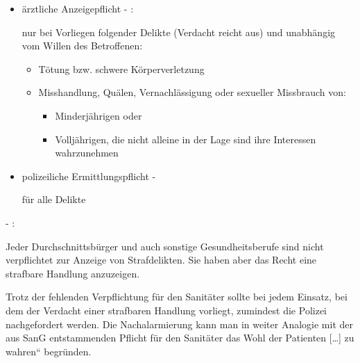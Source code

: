 \begin{itemize}
    \item {\mdseries
    ärztliche Anzeigepflicht - :}
    
    {\mdseries
    nur bei Vorliegen folgender Delikte (Verdacht reicht aus) und
    unabhängig vom Willen des Betroffenen:}
    
    \begin{itemize}
        \item {\mdseries
        T\"otung bzw. schwere K\"orperverletzung}
        
        \item {\mdseries
        Misshandlung, Quälen, Vernachlässigung oder sexueller Missbrauch
        von:}
        
        \begin{itemize}
            \item {\mdseries
            Minderjährigen oder}
            
            \item {\mdseries
            Volljährigen, die nicht alleine in der Lage sind ihre Interessen
            wahrzunehmen}
            
        \end{itemize}
    \end{itemize}
    
    \item {\mdseries
    polizeiliche Ermittlungspflicht - }
    
    {\mdseries
    f\"ur alle Delikte}
    
\end{itemize}

{\mdseries
{} - :}

Jeder Durchschnittsb\"urger und auch sonstige Gesundheitsberufe sind
nicht verpflichtet zur Anzeige von Strafdelikten. Sie haben aber das
Recht eine strafbare Handlung anzuzeigen.

Trotz der fehlenden Verpflichtung f\"ur den Sanitäter sollte bei jedem
Einsatz, bei dem der Verdacht einer strafbaren Handlung vorliegt,
zumindest die Polizei nachgefordert werden. Die Nachalarmierung kann
man in weiter Analogie mit der aus  SanG
entstammenden Pflicht f\"ur den Sanitäter {\quotedblbase}das Wohl der
Patienten [{\dots}] zu wahren{\textquotedblleft} begr\"unden.


